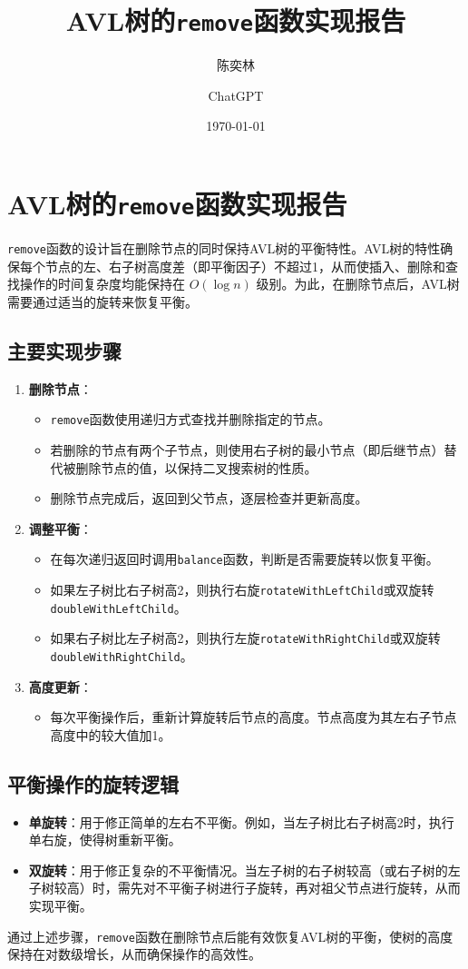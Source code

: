 \documentclass{article}
\title{AVL树的\texttt{remove}函数实现报告}
\author{陈奕林 \and ChatGPT}
\date{\today}
\begin{document}
\maketitle

\section*{AVL树的\texttt{remove}函数实现报告}

\texttt{remove}函数的设计旨在删除节点的同时保持AVL树的平衡特性。AVL树的特性确保每个节点的左、右子树高度差（即平衡因子）不超过1，从而使插入、删除和查找操作的时间复杂度均能保持在 $O(\log n)$ 级别。为此，在删除节点后，AVL树需要通过适当的旋转来恢复平衡。

\subsection*{主要实现步骤}

\begin{enumerate}
    \item \textbf{删除节点}：
    \begin{itemize}
        \item \texttt{remove}函数使用递归方式查找并删除指定的节点。
        \item 若删除的节点有两个子节点，则使用右子树的最小节点（即后继节点）替代被删除节点的值，以保持二叉搜索树的性质。
        \item 删除节点完成后，返回到父节点，逐层检查并更新高度。
    \end{itemize}
    
    \item \textbf{调整平衡}：
    \begin{itemize}
        \item 在每次递归返回时调用\texttt{balance}函数，判断是否需要旋转以恢复平衡。
        \item 如果左子树比右子树高2，则执行右旋\texttt{rotateWithLeftChild}或双旋转\texttt{doubleWithLeftChild}。
        \item 如果右子树比左子树高2，则执行左旋\texttt{rotateWithRightChild}或双旋转\texttt{doubleWithRightChild}。
    \end{itemize}

    \item \textbf{高度更新}：
    \begin{itemize}
        \item 每次平衡操作后，重新计算旋转后节点的高度。节点高度为其左右子节点高度中的较大值加1。
    \end{itemize}
\end{enumerate}

\subsection*{平衡操作的旋转逻辑}

\begin{itemize}
    \item \textbf{单旋转}：用于修正简单的左右不平衡。例如，当左子树比右子树高2时，执行单右旋，使得树重新平衡。
    \item \textbf{双旋转}：用于修正复杂的不平衡情况。当左子树的右子树较高（或右子树的左子树较高）时，需先对不平衡子树进行子旋转，再对祖父节点进行旋转，从而实现平衡。
\end{itemize}

通过上述步骤，\texttt{remove}函数在删除节点后能有效恢复AVL树的平衡，使树的高度保持在对数级增长，从而确保操作的高效性。
\end{document}
